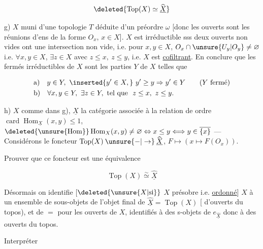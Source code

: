 
\[
\deleted{\operatorname{Top}(X)\simeq\widehat{\underline X}}
\]


g) $X$ muni d'une topologie $T$ déduite d'un préordre $\omega$ [donc les ouverts
sont les réunions d'ens de la forme $O_x$, $x\in X$]. $X$ est irréductible
sss deux ouverts non vides ont une intersection non vide, i.e. pour
$x,y\in X$, $O_x\cap\unsure{U_y|O_y}\ne\varnothing$ i.e. $\forall x,y\in X$, $\exists z\in X$ avec $z\leq x,\ z\leq y$,
i.e. $X$ est \uline{cofiltrant}. En conclure que les fermés irréductibles
de $X$ sont les parties $Y$ de $X$ telles que

\[
\begin{aligned}
&\text{a)}\quad y\in Y,\ \inserted{y'\in X,}\ y'\geq y\Rightarrow y'\in Y\qquad(Y\text{ fermé})\\
&\text{b)}\quad\forall x,y\in Y,\ \exists z\in Y,\ \text{tel que }\ z\leq x,\ z\leq y.
\end{aligned}
\]

h) $X$ comme dans g), $\underline X$ la catégorie associée à la relation de ordre
$\operatorname{card}\operatorname{Hom}_{\underline X}(x,y)\leq1$, $\deleted{\unsure{\mathrm{Hom}}}\operatorname{Hom}_{X}(x,y)\ne\varnothing\Leftrightarrow x\leq y\Longleftrightarrow y\in\overline{\{x\}}$ ---
Considérons le foncteur $\operatorname{Top}(X)\mathbin{\unsure{-|\to}}\widehat{\underline X}$, $F\longmapsto(x\longmapsto F(O_x))$.

Prouver que ce foncteur est une équivalence

\[
\operatorname{Top}(X)\mathrel{\overset{\sim}{\simeq}}\widehat{\underline X}
\]

Désormais on identifie [$\deleted{\unsure{X|\text{si}}}$ $X$ présobre i.e. \uline{ordonné}] $X$ à un
ensemble de sous-objets de l'objet final de $\widehat{\underline X}=\operatorname{Top}(X)$
[ d'ouverts du topos), et de $=$ pour les ouverts de $X$,
identifiés à des s-objets de $e_{\widehat{\underline X}}$ donc à des ouverts du topos.

Interpréter

